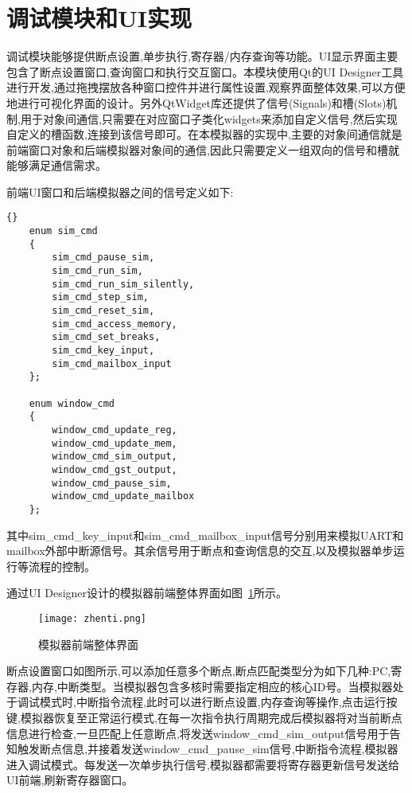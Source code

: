 

\section{调试模块和UI实现}
调试模块能够提供断点设置,单步执行,寄存器/内存查询等功能。UI显示界面主要包含了断点设置窗口,查询窗口和执行交互窗口。本模块使用Qt的UI Designer工具进行开发,通过拖拽摆放各种窗口控件并进行属性设置,观察界面整体效果,可以方便地进行可视化界面的设计。另外QtWidget库还提供了信号(Signals)和槽(Slots)机制,用于对象间通信,只需要在对应窗口子类化widgets来添加自定义信号,然后实现自定义的槽函数,连接到该信号即可。在本模拟器的实现中,主要的对象间通信就是前端窗口对象和后端模拟器对象间的通信,因此只需要定义一组双向的信号和槽就能够满足通信需求。


前端UI窗口和后端模拟器之间的信号定义如下:
\begin{lstlisting}{}
    enum sim_cmd
    {
        sim_cmd_pause_sim,
        sim_cmd_run_sim,
        sim_cmd_run_sim_silently,
        sim_cmd_step_sim,
        sim_cmd_reset_sim,
        sim_cmd_access_memory,
        sim_cmd_set_breaks,
        sim_cmd_key_input,
        sim_cmd_mailbox_input
    };
        
    enum window_cmd
    {
        window_cmd_update_reg,
        window_cmd_update_mem,
        window_cmd_sim_output,
        window_cmd_gst_output,
        window_cmd_pause_sim,
        window_cmd_update_mailbox
    };          
\end{lstlisting}
其中sim\_cmd\_key\_input和sim\_cmd\_mailbox\_input信号分别用来模拟UART和mailbox外部中断源信号。其余信号用于断点和查询信息的交互,以及模拟器单步运行等流程的控制。
        
        
通过UI Designer设计的模拟器前端整体界面如图~\ref{fig:zhenti}所示。
\begin{figure}[h]
    \centering
    \texttt{[image: zhenti.png]}
    \caption{模拟器前端整体界面}
    \label{fig:zhenti}
\end{figure}


断点设置窗口如图所示,可以添加任意多个断点,断点匹配类型分为如下几种:PC,寄存器,内存,中断类型。当模拟器包含多核时需要指定相应的核心ID号。当模拟器处于调试模式时,中断指令流程,此时可以进行断点设置,内存查询等操作,点击运行按键,模拟器恢复至正常运行模式,在每一次指令执行周期完成后模拟器将对当前断点信息进行检查,一旦匹配上任意断点,将发送window\_cmd\_sim\_output信号用于告知触发断点信息,并接着发送window\_cmd\_pause\_sim信号,中断指令流程,模拟器进入调试模式。每发送一次单步执行信号,模拟器都需要将寄存器更新信号发送给UI前端,刷新寄存器窗口。


